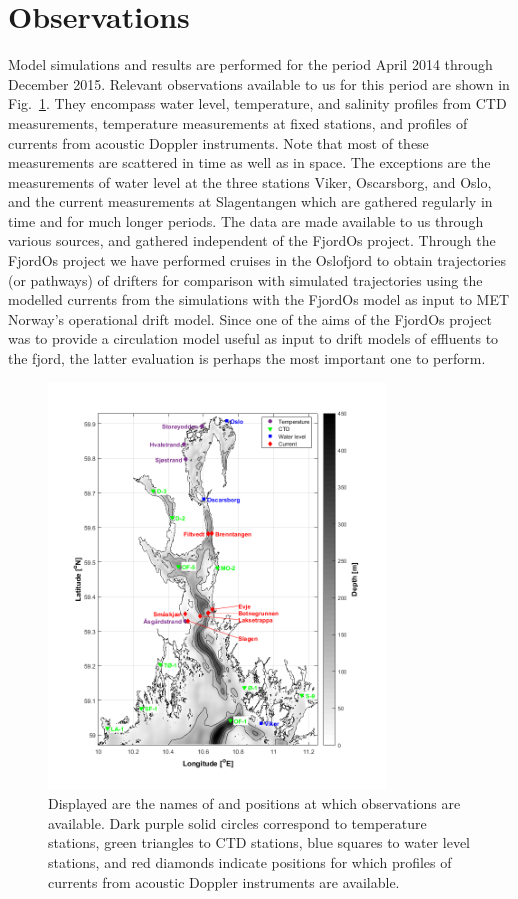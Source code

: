 \section{Observations}

Model simulations and results are performed for the period April 2014 through December 2015. Relevant observations available to us for this period are shown in Fig.~\ref{fig:kart_obs}. They encompass water level, temperature, and salinity profiles from CTD measurements, temperature measurements at fixed stations, and profiles of currents from acoustic Doppler instruments. Note that most of these measurements are scattered in time as well as in space. The exceptions are the measurements of water level at the three stations Viker, Oscarsborg, and Oslo, and the current measurements at Slagentangen which are gathered regularly in time and for much longer periods. The data are made available to us through various sources, and gathered independent of the FjordOs project. Through the FjordOs project we have performed cruises in the Oslofjord to obtain trajectories (or pathways) of drifters for comparison with simulated trajectories using the modelled currents from the simulations with the FjordOs model as input to MET Norway's operational drift model. Since one of the aims of the FjordOs project was to provide a circulation model useful as input to drift models of effluents to the fjord, the latter evaluation is perhaps the most important one to perform.

\begin{figure}[htb]
\centerline{
\includegraphics*[trim=0cm 0.8cm 0cm 0cm,clip=true,width=0.8\textwidth]{Figurer/kart_obs}
}
\caption{\small
Displayed are the names of and positions at which observations are available. Dark purple solid circles correspond to temperature stations, green triangles to CTD stations, blue squares to water level stations, and red diamonds indicate positions for which profiles of currents from acoustic Doppler instruments are available.
}
\label{fig:kart_obs}
\end{figure}


